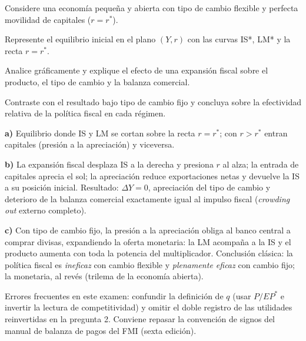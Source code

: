 \documentclass[soluciones]{academic-exam}
\begin{document}
\begin{pregunta}
Considere una economía pequeña y abierta con tipo de cambio flexible y
perfecta movilidad de capitales ($r = r^{*}$).
\begin{apartados}
  \item Represente el equilibrio inicial en el plano $(Y, r)$ con las
        curvas IS*, LM* y la recta $r = r^{*}$. 
  \item Analice gráficamente y explique el efecto de una expansión
        fiscal sobre el producto, el tipo de cambio y la balanza
        comercial. 
  \item Contraste con el resultado bajo tipo de cambio fijo y concluya
        sobre la efectividad relativa de la política fiscal en cada
        régimen. 
\end{apartados}
\begin{solucion}
\textbf{a)} Equilibrio donde IS y LM se cortan sobre la recta
$r = r^{*}$; con $r > r^{*}$ entran capitales (presión a la apreciación)
y viceversa.

\textbf{b)} La expansión fiscal desplaza IS a la derecha y presiona $r$
al alza; la entrada de capitales aprecia el sol; la apreciación reduce
exportaciones netas y devuelve la IS a su posición inicial. Resultado:
$\Delta Y = 0$, apreciación del tipo de cambio y deterioro de la balanza
comercial exactamente igual al impulso fiscal (\emph{crowding out}
externo completo).

\textbf{c)} Con tipo de cambio fijo, la presión a la apreciación obliga
al banco central a comprar divisas, expandiendo la oferta monetaria: la
LM acompaña a la IS y el producto aumenta con toda la potencia del
multiplicador. Conclusión clásica: la política fiscal es \emph{ineficaz}
con cambio flexible y \emph{plenamente eficaz} con cambio fijo; la
monetaria, al revés (trilema de la economía abierta).
\end{solucion}
\end{pregunta}

\begin{observacion}
Errores frecuentes en este examen: confundir la definición de $q$ (usar
$P/EP^{*}$ e invertir la lectura de competitividad) y omitir el doble
registro de las utilidades reinvertidas en la pregunta 2. Conviene
repasar la convención de signos del manual de balanza de pagos del FMI
(sexta edición).
\end{observacion}

\findelexamen
\end{document}
